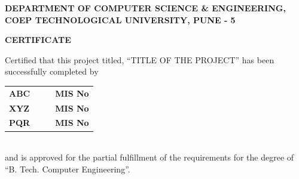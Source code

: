 % 
\thispagestyle{empty}
\linespread{2}
\begin{center}			%
	\large{\bf{DEPARTMENT OF COMPUTER SCIENCE \& ENGINEERING,\\ 
	      COEP TECHNOLOGICAL UNIVERSITY, PUNE - 5\\}}	
\end{center}

\vspace{20pt}			%

\begin{center}
	\Large{\bf{CERTIFICATE\\}}
\end{center}

\vspace{20pt}

\linespread{1.5}			%
\selectfont
\large{
Certified that this project titled, ``TITLE OF THE PROJECT''
has been successfully completed by \\ 
\begin{table}[htbp]
	\begin{center}
	\begin{tabular}{ l c c l }
	\Large\bf{ABC} & & & \Large\bf{MIS No} \\ [0.3cm]
	\Large\bf{XYZ} & & & \Large\bf{MIS No} \\ [0.3cm]
	\Large\bf{PQR} & & & \Large\bf{MIS No} \\
	\end{tabular}
	\end{center}
	\end{table} \\
and is approved for the partial fulfillment of the requirements for the degree of 
``B. Tech. Computer Engineering''.
}

\vspace{60pt}

